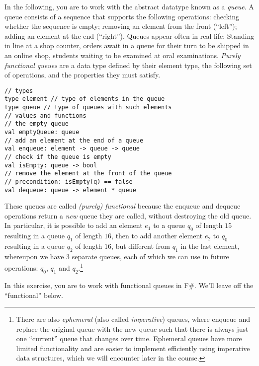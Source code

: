 In the following, you are to work with the abstract datatype known as a \emph{queue}. A queue consists of
a sequence that supports the following operations: checking whether the sequence is empty; removing an element from the front (``left''); adding an element at the end (``right'').  Queues appear often in real life: Standing in line at a shop counter, orders await in a queue for their turn to be shipped in an online shop, students waiting to be examined at oral examinations. \emph{Purely functional queues} are a data type defined by their element type, the following set of operations, and the properties they must satisfy.
\begin{lstlisting}
// types
type element // type of elements in the queue
type queue // type of queues with such elements
// values and functions
// the empty queue
val emptyQueue: queue 
// add an element at the end of a queue
val enqueue: element -> queue -> queue
// check if the queue is empty
val isEmpty: queue -> bool
// remove the element at the front of the queue
// precondition: isEmpty(q) == false
val dequeue: queue -> element * queue
\end{lstlisting}
These queues are called \emph{(purely) functional} because the enqueue and dequeue operations return a \emph{new} queue they are called, without destroying the old queue.  In particular, it is possible to add an element $e_1$ to a queue $q_0$ of length $15$ resulting in a queue $q_1$ of length $16$, then to add another element $e_2$ to $q_0$ resulting in a queue $q_2$ of length $16$, but different from $q_1$ in the last element, whereupon we have 3 separate queues, each of which we can use in future operations: $q_0$, $q_1$ and $q_2$.\footnote{There are also \emph{ephemeral} (also called \emph{imperative}) queues, where enqueue and replace the original queue with the new queue such that there is always just one ``current'' queue that changes over time.  Ephemeral queues have more limited functionality and are easier to implement efficiently using imperative data structures, which we will encounter later in the course.} 

In this exercise, you are to work with functional queues in F\#.  We'll leave off the ``functional'' below.